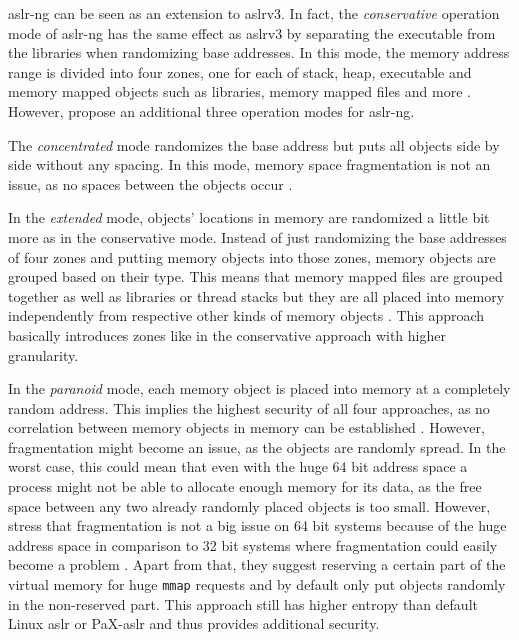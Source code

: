 \gls{aslr-ng} can be seen as an extension to \acs{aslr}v3.
In fact, the \emph{conservative} operation mode of \gls{aslr-ng} has the same effect as \acs{aslr}v3 by separating the executable from the libraries when randomizing base addresses.
In this mode, the memory address range is divided into four zones, one for each of stack, heap, executable and memory mapped objects such as libraries, memory mapped files and more \cite[11]{MarcoGisbert2016}.
However, \citeauthor{MarcoGisbert2016} propose an additional three operation modes for \gls{aslr-ng}.

The \emph{concentrated} mode randomizes the base address but puts all objects side by side without any spacing.
In this mode, memory space fragmentation is not an issue, as no spaces between the objects occur \cite[11]{MarcoGisbert2016}.

In the \emph{extended} mode, objects' locations in memory are randomized a little bit more as in the conservative mode.
Instead of just randomizing the base addresses of four zones and putting memory objects into those zones, memory objects are grouped based on their type.
This means that memory mapped files are grouped together as well as libraries or thread stacks but they are all placed into memory independently from respective other kinds of memory objects \cite[11]{MarcoGisbert2016}.
This approach basically introduces zones like in the conservative approach with higher granularity.

In the \emph{paranoid} mode, each memory object is placed into memory at a completely random address.
This implies the highest security of all four approaches, as no correlation between memory objects in memory can be established \cite[11]{MarcoGisbert2016}.
However, fragmentation might become an issue, as the objects are randomly spread.
In the worst case, this could mean that even with the huge 64 bit address space a process might not be able to allocate enough memory for its data, as the free space between any two already randomly placed objects is too small.
However, \citeauthor{MarcoGisbert2016} stress that fragmentation is not a big issue on 64 bit systems because of the huge address space in comparison to 32 bit systems where fragmentation could easily become a problem \cite[3]{MarcoGisbert2016}.
Apart from that, they suggest reserving a certain part of the virtual memory for huge \texttt{mmap} requests and by default only put objects randomly in the non-reserved part.
This approach still has higher entropy than default Linux \gls{aslr} or PaX-\gls{aslr} \cite[10\psq]{MarcoGisbert2016} and thus provides additional security.

